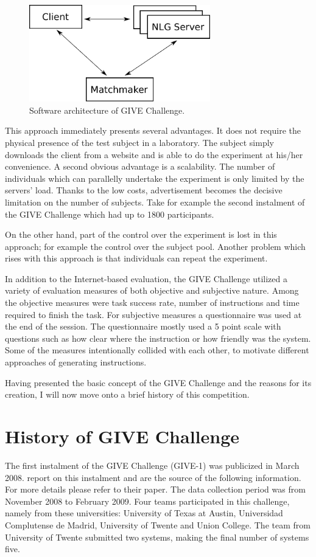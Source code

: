 \begin{figure}[!htbp]
  \centering
	\includegraphics[width=0.7\textwidth]{Images/give-client-servers}
	\caption{Software architecture of GIVE Challenge.}
	\label{fig:give-clientserver}
\end{figure}

This approach immediately presents several advantages. It does not require the physical presence of the test subject in a laboratory. The subject simply downloads the client from a website and is able to do the experiment at his/her convenience. A second obvious advantage is a scalability. The number of individuals which can parallelly undertake the experiment is only limited by the servers' load. Thanks to the low costs, advertisement becomes the decisive limitation on the number of subjects. Take for example the second instalment of the GIVE Challenge which had up to 1800 participants.

On the other hand, part of the control over the experiment is lost in this approach; for example the control over the subject pool. Another problem which rises with this approach is that individuals can repeat the experiment.

In addition to the Internet-based evaluation, the GIVE Challenge utilized a variety of evaluation measures of both objective and subjective nature. Among the objective measures were task success rate, number of instructions and time required to finish the task. For subjective measures a questionnaire was used at the end of the session. The questionnaire mostly used a 5 point scale with questions such as how clear where the instruction or how friendly was the system. Some of the measures intentionally collided with each other, to motivate different approaches of generating instructions.

Having presented the basic concept of the GIVE Challenge and the reasons for its creation, I will now move onto a brief history of this competition. 

 
\section{History of GIVE Challenge}
The first instalment of the GIVE Challenge (GIVE-1) was publicized in March 2008. \citet{koller2010first} report on this instalment and are the source of the following information. For more details please refer to their paper. The data collection period was from November 2008 to February 2009. Four teams participated in this challenge, namely from these universities: University of Texas at Austin, Universidad Complutense de Madrid, University of Twente and Union College. The team from University of Twente submitted two systems, making the final number of systems five.

